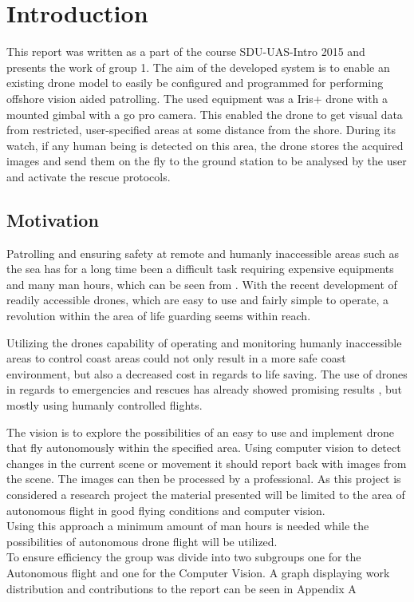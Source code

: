 \chapter*{Introduction}

This report was written as a part of the course  SDU-UAS-Intro 2015 and presents the work of group 1. 
The aim of the developed system is to enable an existing drone model to easily be configured and
programmed for performing offshore vision aided patrolling. 
The used equipment was a Iris+ drone with a mounted gimbal with a go pro camera.
This enabled the drone to get visual data from restricted, user-specified areas at some distance from the shore.
During its watch, if any human being is detected on this area, the drone stores the acquired images and send
them on the fly to the ground station to be analysed by the user and activate the rescue protocols. 



\section*{Motivation}
Patrolling and ensuring safety at remote and humanly inaccessible areas such as the sea has for a long time
been a difficult task requiring expensive equipments and many man hours, which can be seen from \cite{Ref:Drone2}.
With the recent development of readily accessible drones, which are easy to use and fairly simple to operate,
a revolution within the area of life guarding seems within reach. 

Utilizing the drones capability of operating and monitoring humanly inaccessible areas to control coast areas
could not only result in a more safe coast environment, but also a decreased cost in regards to life saving.
The use of drones in regards to emergencies and rescues has already showed promising results
\cite{Ref:Drone1} \cite{Ref:Drone3} \cite{Ref:Drone4} \cite{Ref:DroneResearch1} \cite{Ref:DroneResearch1},
but mostly using humanly controlled flights.

The vision is to explore the possibilities of an easy to use and implement drone that fly autonomously within the specified area.
Using computer vision to detect changes in the current scene or movement it should report back with images from the scene.
The images can then be processed by a professional. As this project is considered a research project the material presented
will be limited to the area of autonomous flight in good flying conditions and computer vision.
\\ 
Using this approach a minimum amount of man hours is needed while the possibilities of autonomous drone flight will be utilized.
\\
To ensure efficiency the group was divide into two subgroups one for the Autonomous flight and one for the Computer Vision.
A graph displaying work distribution and contributions to the report can be seen in Appendix A

